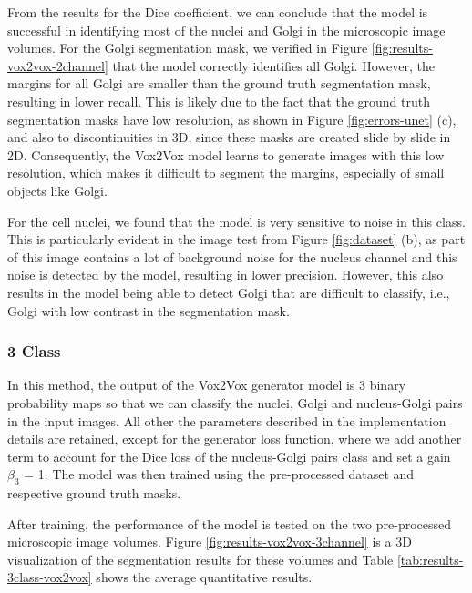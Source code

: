 From the results for the Dice coefficient, we can conclude that the model is successful in identifying most of the nuclei and Golgi in the microscopic image volumes. For the Golgi segmentation mask, we verified in Figure \ref{fig:results-vox2vox-2channel} that the model correctly identifies all Golgi. However, the margins for all Golgi are smaller than the ground truth segmentation mask, resulting in lower recall. This is likely due to the fact that the ground truth segmentation masks have low resolution, as shown in Figure \ref{fig:errors-unet} (c), and also to discontinuities in \ac{3D}, since these masks are created slide by slide in 2D. Consequently, the Vox2Vox model learns to generate images with this low resolution, which makes it difficult to segment the margins, especially of small objects like Golgi.

For the cell nuclei, we found that the model is very sensitive to noise in this class. This is particularly evident in the image test from Figure \ref{fig:dataset} (b), as part of this image contains a lot of background noise for the nucleus channel and this noise is detected by the model, resulting in lower precision. However, this also results in the model being able to detect Golgi that are difficult to classify, i.e., Golgi with low contrast in the segmentation mask.


\subsubsection*{3 Class}
In this method, the output of the Vox2Vox generator model is 3 binary probability maps so that we can classify the nuclei, Golgi and nucleus-Golgi pairs in the input images. All other the parameters described in the implementation details are retained, except for the generator loss function, where we add another term to account for the Dice loss of the nucleus-Golgi pairs class and set a gain $\beta_3$ = 1. The model was then trained using the pre-processed dataset and respective ground truth masks.

After training, the performance of the model is tested on the two pre-processed microscopic image volumes. Figure \ref{fig:results-vox2vox-3channel} is a \ac{3D} visualization of the segmentation results for these volumes and Table \ref{tab:results-3class-vox2vox} shows the average quantitative results.

\begin{table}[!htb]
\centering
\caption{Average metric values obtained from testing the 3 class Vox2Vox model on two pre-processed microscopic images}
\label{tab:results-3class-vox2vox}
\end{table}

